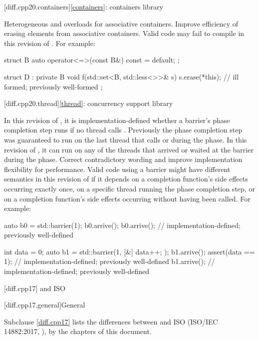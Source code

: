 [diff.cpp20.containers]{\ref{containers}: containers library}

\change
Heterogeneous  and  overloads
for associative containers.
\rationale
Improve efficiency of erasing elements from associative containers.
\effect
Valid \CppXX{} code may fail to compile in this revision of \Cpp{}.
For example:
\begin{codeblock}
struct B {
  auto operator<=>(const B&) const = default;
};

struct D : private B {
  void f(std::set<B, std::less<>>& s) {
    s.erase(*this);             // ill formed; previously well-formed
  }
};
\end{codeblock}

[diff.cpp20.thread]{\ref{thread}: concurrency support library}

\change
In this revision of \Cpp{},
it is implementation-defined whether a barrier's phase completion step runs
if no thread calls .
Previously the phase completion step was guaranteed to run on the last thread that calls  or  during the phase.
In this revision of \Cpp{},
it can run on any of the threads that arrived or waited at the barrier
during the phase.
\rationale
Correct contradictory wording and
improve implementation flexibility for performance.
\effect
Valid \CppXX{} code using a barrier might have
different semantics in this revision of \Cpp{}
if it depends on a completion function's side effects occurring exactly once,
on a specific thread running the phase completion step, or
on a completion function's side effects occurring
without  having been called.
For example:
\begin{codeblock}
auto b0 = std::barrier(1);
b0.arrive();
b0.arrive();            // implementation-defined; previously well-defined

int data = 0;
auto b1 = std::barrier(1, [&] { data++; });
b1.arrive();
assert(data == 1);      // implementation-defined; previously well-defined
b1.arrive();            // implementation-defined; previously well-defined
\end{codeblock}

[diff.cpp17]{\Cpp{} and ISO \CppXVII{}}

[diff.cpp17.general]{General}

\pnum
{}%
Subclause \ref{diff.cpp17} lists the differences between \Cpp{} and
ISO \CppXVII{} (ISO/IEC 14882:2017, ),
by the chapters of this document.

